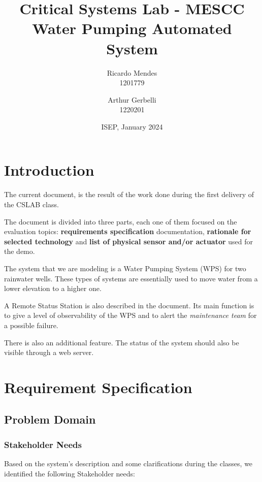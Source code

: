 \documentclass[11pt]{article}
\title{\textbf{Critical Systems Lab - MESCC\\ Water Pumping Automated System}}
\date{ISEP, January 2024}
\author{Ricardo Mendes\\ 1201779
\and Arthur Gerbelli\\ 1220201}
\begin{document}
\maketitle              
\newpage
\tableofcontents
\newpage

%
\section{Introduction}

The current document, is the result of the work done during the first delivery of the CSLAB class.

The document is divided into three parts, each one of them focused on the evaluation topics: \textbf{requirements specification} documentation, \textbf{rationale for selected technology} and \textbf{list of physical sensor and/or actuator} used for the demo.

The system that we are modeling is a Water Pumping System (WPS) for two rainwater wells. These types of systems are essentially used to move water from a lower elevation to a higher one.

A Remote Status Station is also described in the document. Its main function is to give a level of observability of the WPS and to alert the \textit{maintenance team} for a possible failure.

There is also an additional feature. The status of the system should also be visible through a web server.


\section{Requirement Specification}

\subsection{Problem Domain}

\subsubsection{Stakeholder Needs}

Based on the system's description and some clarifications during the classes, we identified the following Stakeholder needs:
\end{document}
